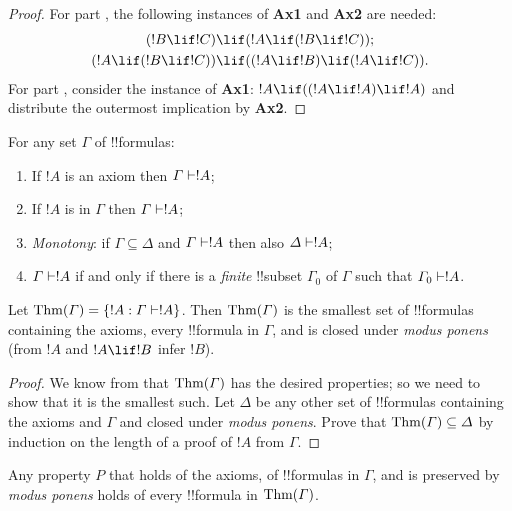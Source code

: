 \documentclass[../../include/open-logic-section]{subfiles}
\begin{document}
\begin{proof}
For part , the following instances
of \textbf{Ax1} and \textbf{Ax2} are needed:
\begin{align*}
  (!B \lif !C) & \lif (!A \lif (!B \lif !C)); \\
  (!A \lif (!B \lif !C)) & \lif ((!A \lif !B) \lif
    (!A \lif !C)).
\end{align*}
For part , consider the instance of
\textbf{Ax1}: $!A \lif ((!A \lif !A) \lif
!A)$ and distribute the outermost implication by \textbf{Ax2}.
\end{proof}

\begin{prop}
For any set $\Gamma$ of !!{formula}s:
\begin{enumerate}
\item If $!A$ is an axiom then $\Gamma \Proves !A$;
\item If $!A$ is in $\Gamma$ then $\Gamma \Proves
  !A$;
\item \emph{Monotony}: if $\Gamma \subseteq \Delta$ and $\Gamma
  \Proves !A$ then also $\Delta \Proves
  !A$;
\item $\Gamma \Proves !A$ if and only if there is a \emph{finite}
  !!{subset} $\Gamma_0$ of $\Gamma$ such that $\Gamma_0 \Proves !A$.
\end{enumerate}
\end{prop}

\begin{thm}
Let $\Thms{\Gamma} = \Setabs{!A}{\Gamma \Proves !A}$. Then
$\mathrm{Thm}(\Gamma)$ is the smallest set of !!{formula}s containing the
axioms, every !!{formula} in $\Gamma$, and is closed under \emph{modus
  ponens} (from $!A$ and $!A \lif !B$ infer $!B$).
\end{thm} 

\begin{proof}
We know from  that $\mathrm{Thm}(\Gamma)$ has the desired
properties; so we need to show that it is the smallest such. Let
$\Delta$ be any other set of !!{formula}s containing the axioms and
$\Gamma$ and closed under \emph{modus ponens}. Prove that
$\mathrm{Thm}(\Gamma) \subseteq \Delta$ by induction on the length of a proof
of $!A$ from $\Gamma$.
\end{proof}

\begin{cor}
Any property $P$ that holds of the axioms, of !!{formula}s in
$\Gamma$, and is preserved by \emph{modus ponens} holds of every
!!{formula} in $\mathrm{Thm}(\Gamma)$.
\end{cor}
\end{document}
